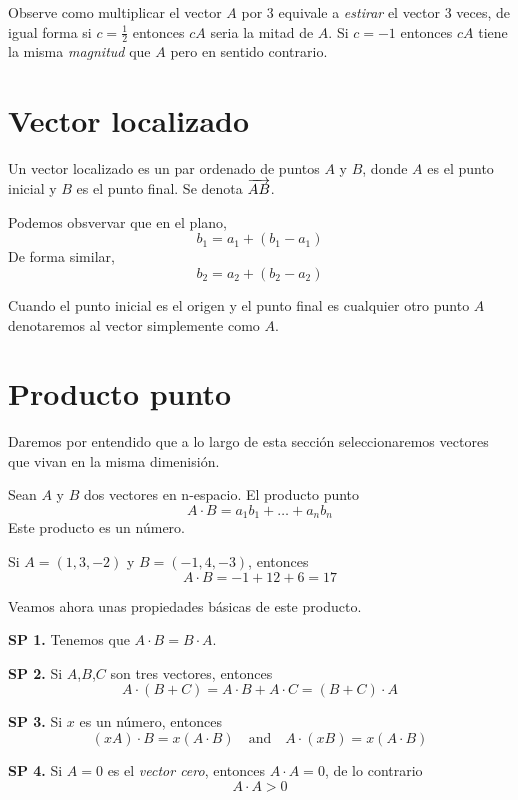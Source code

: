 Observe como multiplicar el vector $A$ por $3$ equivale a \emph{estirar} el vector $3$ veces, de igual forma
si $c=\frac{1}{2}$ entonces $cA$ seria la mitad de $A$. Si $c=-1$ entonces $cA$ tiene la misma \emph{magnitud}
que $A$ pero en sentido contrario.

\section{Vector localizado}

\begin{definition}
    Un vector localizado es un par ordenado de puntos $A$ y $B$, donde $A$ es el punto inicial y $B$ es el punto final. Se
    denota $\overrightarrow{AB}$.
\end{definition}

Podemos obsvervar que en el plano,
$$ b_{1} = a_{1} + (b_{1} - a_{1}) $$
De forma similar,
$$ b_{2} = a_{2} + (b_{2} - a_{2}) $$

Cuando el punto inicial es el origen y el punto final es cualquier otro punto $A$ denotaremos al vector simplemente como $A$.

\section{Producto punto}

Daremos por entendido que a lo largo de esta sección seleccionaremos vectores que vivan en la misma dimenisión.

\begin{definition}
    Sean $A$ y $B$ dos vectores en n-espacio. El producto punto
    $$ A \cdot B = a_{1}b_{1} + \ldots + a_{n}b_{n} $$
    Este producto es un número.
\end{definition}

\begin{myExample}
    Si $A=(1,3,-2)$ y $B=(-1,4,-3)$, entonces
    $$ A \cdot B = -1 + 12 + 6 = 17 $$
\end{myExample}

Veamos ahora unas propiedades básicas de este producto.

\begin{labeling}{}
    \item [\textbf{SP 1.}] Tenemos que $A \cdot B = B \cdot A$.
    \item [\textbf{SP 2.}] Si $A$,$B$,$C$ son tres vectores, entonces
        $$ A \cdot (B+C) = A \cdot B + A \cdot C = (B+C) \cdot A$$
    \item [\textbf{SP 3.}] Si $x$ es un número, entonces
        $$ (xA) \cdot B = x(A \cdot B) \quad \text{and} \quad A \cdot (xB) = x(A \cdot B) $$ 
    \item [\textbf{SP 4.}] Si $A=0$ es el \emph{vector cero}, entonces $A \cdot A = 0$, de lo contrario
        $$ A \cdot A > 0 $$
\end{labeling}

